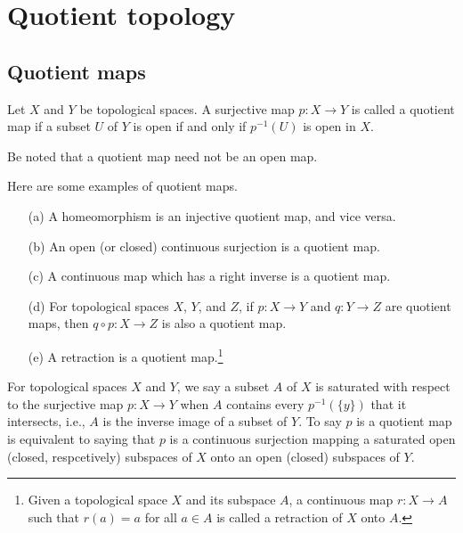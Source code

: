 \section{Quotient topology}

\subsection{Quotient maps}

\begin{defi}
    Let $X$ and $Y$ be topological spaces.
    A surjective map $p: X\rightarrow Y$ is called a quotient map if a subset $U$ of $Y$ is open if and only if $p^{-1}(U)$ is open in $X$.
\end{defi}
\begin{rmk}
    Be noted that a quotient map need not be an open map.
\end{rmk}
\begin{exmp}
    Here are some examples of quotient maps.
    \begin{enumerate}
        \item[(a)]
        {
            A homeomorphism is an injective quotient map, and vice versa.
        }
        \item[(b)]
        {
            An open (or closed) continuous surjection is a quotient map.
        }
        \item[(c)]
        {
            A continuous map which has a right inverse is a quotient map.
        }
        \item[(d)]
        {
            For topological spaces $X$, $Y$, and $Z$, if $p: X\rightarrow Y$ and $q: Y\rightarrow Z$ are quotient maps, then $q\circ p: X\rightarrow Z$ is also a quotient map.
        }
        \item[(e)]
        {
            A retraction is a quotient map.\footnote{Given a topological space $X$ and its subspace $A$, a continuous map $r: X\rightarrow A$ such that $r(a)=a$ for all $a\in A$ is called a retraction of $X$ onto $A$.}
        }
    \end{enumerate}
\end{exmp}

For topological spaces $X$ and $Y$, we say a subset $A$ of $X$ is saturated with respect to the surjective map $p: X\rightarrow Y$ when $A$ contains every $p^{-1}(\{y\})$ that it intersects, i.e., $A$ is the inverse image of a subset of $Y$.
To say $p$ is a quotient map is equivalent to saying that $p$ is a continuous surjection mapping a saturated open (closed, respcetively) subspaces of $X$ onto an open (closed) subspaces of $Y$.

